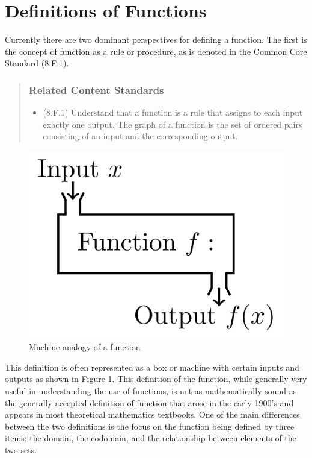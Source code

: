 \documentclass[
]{book}
\providecommand{\tightlist}{%
  \setlength{\itemsep}{0pt}\setlength{\parskip}{0pt}}
\theoremstyle{definition}
\theoremstyle{definition}
\theoremstyle{definition}
\theoremstyle{remark}
\begin{document}
\hypertarget{sec:Function-Def}{%
\section{Definitions of Functions}\label{sec:Function-Def}}

Currently there are two dominant perspectives for defining a function. The first is the concept of function as a rule or procedure, as is denoted in the Common Core Standard (8.F.1).

\begin{quote}
\hypertarget{related-content-standards-21}{%
\subsubsection*{Related Content Standards}\label{related-content-standards-21}}

\begin{itemize}
\tightlist
\item
  (8.F.1) Understand that a function is a rule that assigns to each input exactly one output. The graph of a function is the set of ordered pairs consisting of an input and the corresponding output.
\end{itemize}
\end{quote}

\begin{figure}

{\centering \includegraphics[width=0.4\linewidth]{tikz/function-machine} 

}

\caption{Machine analogy of a function}\label{fig:machine}
\end{figure}

This definition is often represented as a box or machine with certain inputs and outputs as shown in Figure \ref{fig:machine}. This definition of the function, while generally very useful in understanding the use of functions, is not as mathematically sound as the generally accepted definition of function that arose in the early 1900's and appears in most theoretical mathematics textbooks. One of the main differences between the two definitions is the focus on the function being defined by three items: the domain, the codomain, and the relationship between elements of the two sets.
\end{document}
